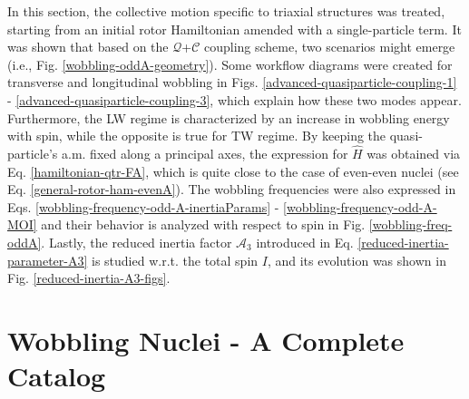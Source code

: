 
In this section, the collective motion specific to triaxial structures was treated, starting from an initial rotor Hamiltonian amended with a single-particle term. It was shown that based on the $\mathcal{Q}$+$\mathscr{C}$ coupling scheme, two scenarios might emerge (i.e., Fig. \ref{wobbling-oddA-geometry}). Some workflow diagrams were created for transverse and longitudinal wobbling in Figs. \ref{advanced-quasiparticle-coupling-1} - \ref{advanced-quasiparticle-coupling-3}, which explain how these two modes appear. Furthermore, the LW regime is characterized by an increase in wobbling energy with spin, while the opposite is true for TW regime. By keeping the quasi-particle's a.m. fixed along a principal axes, the expression for $\hat{H}$ was obtained via Eq. \ref{hamiltonian-qtr-FA}, which is quite close to the case of even-even nuclei (see Eq. \ref{general-rotor-ham-evenA}). The wobbling frequencies were also expressed in Eqs. \ref{wobbling-frequency-odd-A-inertiaParams} - \ref{wobbling-frequency-odd-A-MOI} and their behavior is analyzed with respect to spin in Fig. \ref{wobbling-freq-oddA}. Lastly, the reduced inertia factor $\mathscr{A}_3$ introduced in Eq. \ref{reduced-inertia-parameter-A3} is studied w.r.t. the total spin $I$, and its evolution was shown in Fig. \ref{reduced-inertia-A3-figs}.

\section{Wobbling Nuclei - A Complete Catalog}
\label{section-wobbling-catalog}

